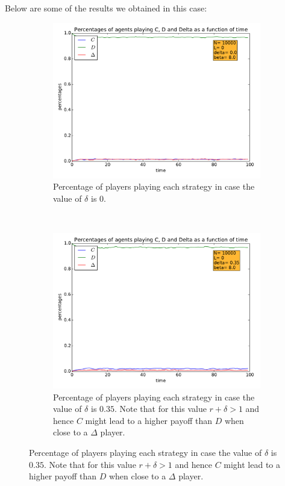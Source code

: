 \documentclass{article}
\begin{document}
Below are some of the results we obtained in this case:

\begin{figure}[htbp] 
\centering
\begin{subfigure}[t]{0.47\textwidth}
  \centering
  \includegraphics[width=\textwidth]{./Figures/IM_nodelta}
  \caption{Percentage of players playing each strategy in case the value of $\delta$ is 0.}
  \label{fig:IM_nodelta} 
\end{subfigure}%
~
~
\begin{subfigure}[t]{0.47\textwidth}
  \centering
  \includegraphics[width=\textwidth]{./Figures/IM_delta}
  \caption{Percentage of players playing each strategy in case the value of $\delta$ is $0.35$. Note that for this value $r+\delta >1$ and hence $C$ might lead to a higher payoff than $D$ when close to a $\Delta$ player.}

\end{subfigure}
\end{figure}
\end{document}
